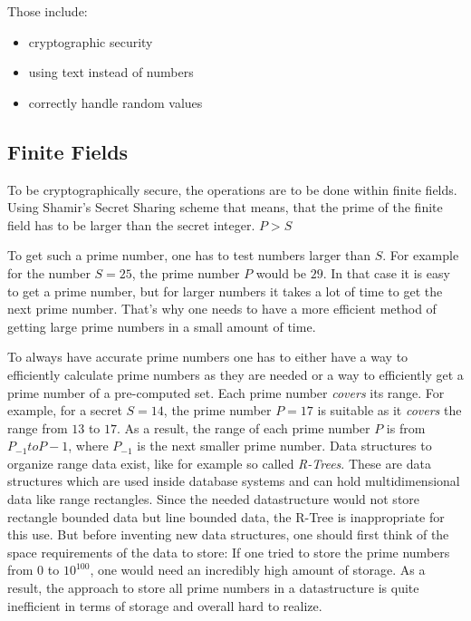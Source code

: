Those include:

\begin{itemize}
  \item cryptographic security
  \item using text instead of numbers
  \item correctly handle random values
\end{itemize}

\subsection{Finite Fields}

To be cryptographically secure, the operations are to be done within finite
fields. Using Shamir's Secret Sharing scheme that means, that the prime of the
finite field has to be larger than the secret integer. $P > S$

To get such a prime number, one has to test numbers larger than $S$. For example
for the number $S = 25$, the prime number $P$ would be $29$. In that case it is
easy to get a prime number, but for larger numbers it takes a lot of time to get
the next prime number. That's why one needs to have a more efficient method of
getting large prime numbers in a small amount of time.

To always have accurate prime numbers one has to either have a way to efficiently
calculate prime numbers as they are needed or a way to efficiently get a prime
number of a pre-computed set. Each prime number \textit{covers} its range. For
example, for a secret $S = 14$, the prime number $P = 17$ is suitable as it
\textit{covers} the range from $13$ to $17$. As a result, the range of each
prime number $P$ is from $P_{-1} to P-1$, where $P_{-1}$ is the next smaller
prime number. Data structures to organize range data exist, like for
example so called \textit{R-Trees}\cite{guttman1984r}. These are data structures
which are used inside database systems and can hold multidimensional data like
range rectangles. Since the needed datastructure would not store rectangle
bounded data but line bounded data, the R-Tree is inappropriate for this use.
But before inventing new data structures, one should first think of the space
requirements of the data to store:
If one tried to store the prime numbers from $0$ to $10^{100}$, one would need
an incredibly high amount of storage. As a result, the approach to store all
prime numbers in a datastructure is quite inefficient in terms of storage and
overall hard to realize.

